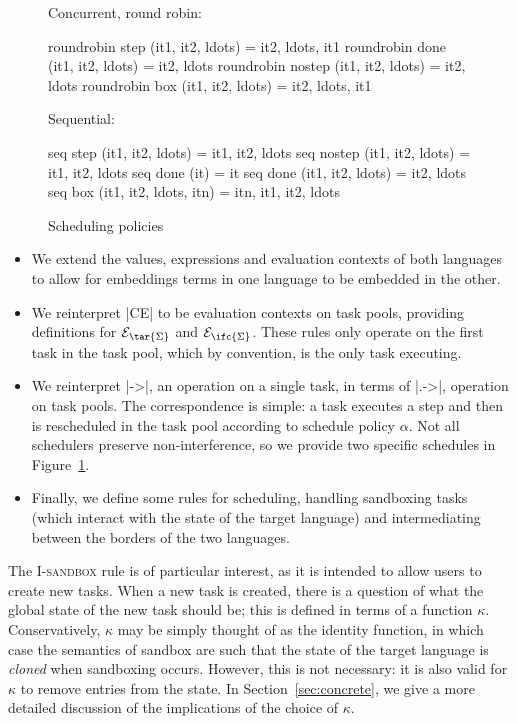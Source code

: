 \begin{figure}
  Concurrent, round robin:
\begin{code}
  roundrobin step (it1, it2, ldots)  = it2, ldots, it1
  roundrobin done (it1, it2, ldots)     = it2, ldots
  roundrobin nostep (it1, it2, ldots)     = it2, ldots
  roundrobin box (it1, it2, ldots)     = it2, ldots, it1
\end{code}
  Sequential:
\begin{code}
  seq step (it1, it2, ldots)     = it1, it2, ldots
  seq nostep (it1, it2, ldots)        = it1, it2, ldots
  seq done (it)                     = it
  seq done (it1, it2, ldots)        = it2, ldots
  seq box (it1, it2, ldots, itn)   = itn, it1, it2, ldots
\end{code}
\caption{Scheduling policies}
\label{fig:scheduler}
\end{figure}

\begin{itemize}
    \item We extend the values, expressions and evaluation contexts of both languages to allow for embeddings terms in one language to be embedded in the other.
    \item We reinterpret |CE| to be evaluation contexts on task pools, providing definitions for $\mathcal{E}_{\tar{\Sigma}}$ and $\mathcal{E}_{\ifc{\Sigma}}$.  These rules only operate on the first task in the task pool, which by convention, is the only task executing.
    \item We reinterpret |->|, an operation on a single task, in terms of |.->|, operation on task pools.  The correspondence is simple: a task executes a step and then is rescheduled in the task pool according to schedule policy $\alpha$.  Not all schedulers preserve non-interference, so we provide two specific schedules in Figure~\ref{fig:scheduler}.
    \item Finally, we define some rules for scheduling, handling sandboxing tasks (which interact with the state of the target language) and intermediating between the borders of the two languages.
\end{itemize}

The \textsc{I-sandbox} rule is of particular interest, as it is intended to allow users
to create new tasks.  When a new task is created, there is a question of what the
global state of the new task should be; this is defined in terms of a function $\kappa$.
Conservatively, $\kappa$ may be simply thought of as the identity function, in which
case the semantics of sandbox are such that the state of the target language is \emph{cloned}
when sandboxing occurs.  However, this is not necessary: it is also valid for $\kappa$
to remove entries from the state.  In Section~\ref{sec:concrete}, we give a more detailed
discussion of the implications of the choice of $\kappa$.

